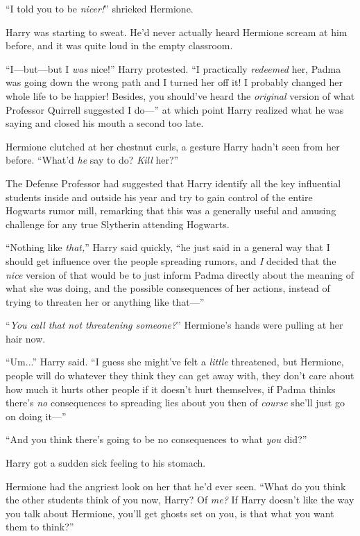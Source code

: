 “I told you to be \emph{nicer!}” shrieked Hermione.

Harry was starting to sweat. He’d never actually heard Hermione scream at him before, and it was quite loud in the empty classroom.

“I—but—but I \emph{was} nice!” Harry protested. “I practically \emph{redeemed} her, Padma was going down the wrong path and I turned her off it! I probably changed her whole life to be happier! Besides, you should’ve heard the \emph{original} version of what Professor Quirrell suggested I do—” at which point Harry realized what he was saying and closed his mouth a second too late.

Hermione clutched at her chestnut curls, a gesture Harry hadn’t seen from her before. “What’d \emph{he} say to do? \emph{Kill} her?”

The Defense Professor had suggested that Harry identify all the key influential students inside and outside his year and try to gain control of the entire Hogwarts rumor mill, remarking that this was a generally useful and amusing challenge for any true Slytherin attending Hogwarts.

“Nothing like \emph{that,}” Harry said quickly, “he just said in a general way that I should get influence over the people spreading rumors, and \emph{I} decided that the \emph{nice} version of that would be to just inform Padma directly about the meaning of what she was doing, and the possible consequences of her actions, instead of trying to threaten her or anything like that—”

“\emph{You call that not threatening someone?}” Hermione’s hands were pulling at her hair now.

“Um...” Harry said. “I guess she might’ve felt a \emph{little} threatened, but Hermione, people will do whatever they think they can get away with, they don’t care about how much it hurts other people if it doesn’t hurt themselves, if Padma thinks there’s \emph{no} consequences to spreading lies about you then of \emph{course} she’ll just go on doing it—”

“And you think there’s going to be no consequences to what \emph{you} did?”

Harry got a sudden sick feeling to his stomach.

Hermione had the angriest look on her that he’d ever seen. “What do you think the other students think of you now, Harry? Of \emph{me?} If Harry doesn’t like the way you talk about Hermione, you’ll get ghosts set on you, is that what you want them to think?”

